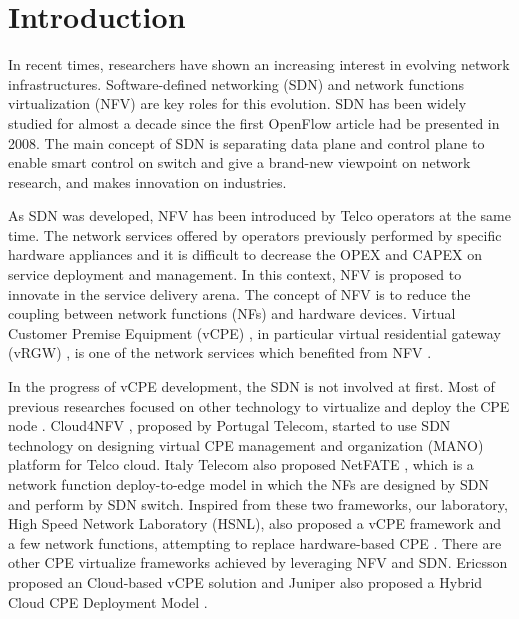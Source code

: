 \chapter{Introduction}
In recent times, researchers have shown an increasing interest in evolving network infrastructures.
Software-defined networking (SDN) and network functions virtualization (NFV) are key roles for this evolution.
SDN \cite{sdn-mckeown-2009-talk, sdn-newnorm, sdn-road, sdn-compre-survey} has been widely studied for almost a decade since the first OpenFlow \cite{openflow-mckeown-2008, openflow-spec} article had be presented in 2008.
The main concept of SDN is separating data plane and control plane to enable smart control on switch and give a brand-new viewpoint on network research, and makes innovation on industries.

As SDN was developed, NFV \cite{nfv-wp, etsi-nfv-archi, nfv-survey} has been introduced by Telco operators at the same time.
The network services offered by operators previously performed by specific hardware appliances and it is difficult to decrease the OPEX and CAPEX on service deployment and management.
In this context, NFV is proposed to innovate in the service delivery arena.
The concept of NFV is to reduce the coupling between network functions (NFs) and hardware devices.
Virtual Customer Premise Equipment (vCPE) \cite{nec-vcpe, vcpe-enhance}, in particular virtual residential gateway (vRGW) \cite{nfv-home}, is one of the network services which benefited from NFV \cite{etsi-nfv-usecase}.

In the progress of vCPE development, the SDN is not involved at first. Most of previous researches focused on other technology to virtualize and deploy the CPE node \cite{virtual-rg, security-vgw, design-vrgw, nfv-hgw-surrogate, linux-cpe, nfv-resoure-contrain-cpe}.
Cloud4NFV \cite{cloud4nfv, cloud4nfv-telco}, proposed by Portugal Telecom, started to use SDN technology on designing virtual CPE management and organization (MANO) platform for Telco cloud.
Italy Telecom also proposed NetFATE \cite{netfate}, which is a network function deploy-to-edge model in which the NFs are designed by SDN and perform by SDN switch.
Inspired from these two frameworks, our laboratory, High Speed Network Laboratory (HSNL), also proposed a vCPE framework and a few network functions, attempting to replace hardware-based CPE \cite{che-wei-master, che-wei-umedia}.
There are other CPE virtualize frameworks achieved by leveraging NFV and SDN.
Ericsson proposed an Cloud-based vCPE solution \cite{ericsson-vcpe} and Juniper also proposed a Hybrid Cloud CPE Deployment Model \cite{juniper-cpe}.

